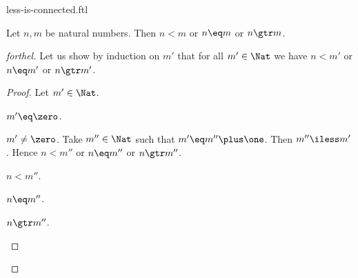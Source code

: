 \documentclass{stex}
\begin{document}
\begin{smodule}{less-is-connected.ftl}


\begin{proposition}[forthel,id=LessIsConnectedProp]
  Let $n, m$ be natural numbers.
  Then $n \less m$ or $n \eq m$ or $n \gtr m$.
\end{proposition}
\begin{proof}[forthel]
  Let us show by induction on $m'$ that for all $m' \in \Nat$ we have $n \less m'$ or $n \eq m'$ or $n \gtr m'$.
  \begin{proof}
    Let $m' \in \Nat$.

    \begin{case}{$m' \eq \zero$.} \end{case}

    \begin{case}{$m' \neq \zero$.}
      Take $m'' \in \Nat$ such that $m' \eq m'' \plus \one$.
      Then $m'' \iless m'$.
      Hence $n \less m''$ or $n \eq m''$ or $n \gtr m''$.

      \begin{case}{$n \less m''$.} \end{case}

      \begin{case}{$n \eq m''$.} \end{case}

      \begin{case}{$n \gtr m''$.} \end{case}
    \end{case}
  \end{proof}
\end{proof}

\end{smodule}
\end{document}
